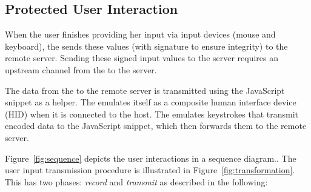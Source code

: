 \subsection{Protected User Interaction}
\label{sec:systemDesign:commit}

When the user finishes providing her input via input devices (mouse and keyboard), the \device sends these values (with signature to ensure integrity) to the remote server. Sending these signed input values to the server requires an upstream channel from the \device to the server. 

\label{sec:systemDesign:commit:upload} 
The data from the \device to the remote server is transmitted using the \name JavaScript snippet as a helper. 
The \device emulates itself as a composite human interface device (HID) when it is connected to the host. The \device emulates keystrokes that transmit encoded data to the \name JavaScript snippet, which then forwards them to the remote server.

 Figure~\ref{fig:sequence} depicts the user interactions in a sequence diagram.. The user input transmission procedure is illustrated in Figure~\ref{fig:transformation}. This has two phases: \emph{record} and \emph{transmit} as described in the following:

